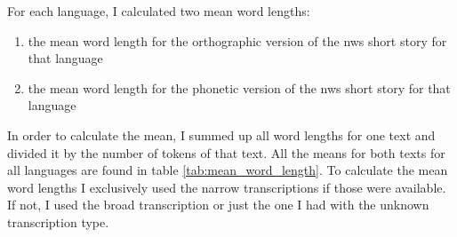 \begin{description}[style=unboxed]
\item[\textsc{3. step - Calculating mean word lengths}:] For each language, I calculated two mean word lengths:
\begin{enumerate}
    \item the mean word length for the orthographic version of the \ac{nws} short story for that language
    \item the mean word length for the phonetic version of the \ac{nws} short story for that language
\end{enumerate}
 In order to calculate the mean, I summed up all word lengths for one text and divided it by the number of tokens of that text. All the means for both texts for all languages are found in table \ref{tab:mean_word_length}. To calculate the mean word lengths I exclusively used the narrow transcriptions if those were available. If not, I used the broad transcription or just the one I had with the unknown transcription type. 


\end{description}
